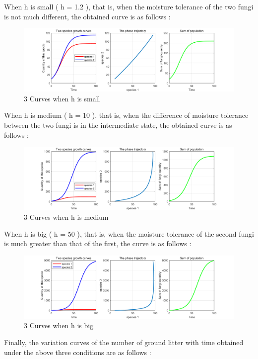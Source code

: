 \documentclass{mcmthesis}
\begin{document}
When h is small ( h = 1.2 ), that is, when the moisture tolerance of the two fungi is not much different, the obtained curve is as follows :
\begin{figure}[H]
	\centering
	\includegraphics[width=1.0\textwidth]{img/h较小.png}
	\caption{3 Curves when h is small}\label{fig:h较小}
\end{figure}
When h is medium ( h = 10 ), that is, when the difference of moisture tolerance between the two fungi is in the intermediate state, the obtained curve is as follows :
\begin{figure}[H]
	\centering
	\includegraphics[width=1.0\textwidth]{img/h中等.png}
	\caption{3 Curves when h is medium}\label{fig:h中等}
\end{figure}
When h is big ( h = 50 ), that is, when the moisture tolerance of the second  fungi is much greater than that of the first, the curve is as follows :
\begin{figure}[H]
	\centering
	\includegraphics[width=1.0\textwidth]{img/h较大.png}
	\caption{3 Curves when h is big}\label{fig:h较大}
\end{figure}
Finally, the variation curves of the number of ground litter with time obtained under the above three conditions are as follows :
\end{document}
